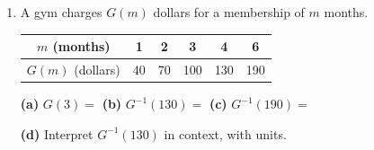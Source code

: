 \documentclass[10pt]{article}
\begin{document}
\begin{enumerate}[leftmargin=1.9em, itemsep=10pt, start=5]

\item A gym charges $G(m)$ dollars for a membership of $m$ months.
      \begin{center}
      \renewcommand{\arraystretch}{1.3}
      \begin{tabular}{|c|c|c|c|c|c|}
      \hline $m$ (months) & 1 & 2 & 3 & 4 & 6 \\ \hline $G(m)$ (dollars) & 40 & 70 & 100 & 130 & 190 \\ \hline
      \end{tabular}
      \end{center}

      \textbf{(a)} $G(3) = $  \hfill
      \textbf{(b)} $G^{-1}(130) = $  \hfill
      \textbf{(c)} $G^{-1}(190) = $ 

      \textbf{(d)} Interpret $G^{-1}(130)$ in context, with units.


\end{enumerate}
\end{document}
